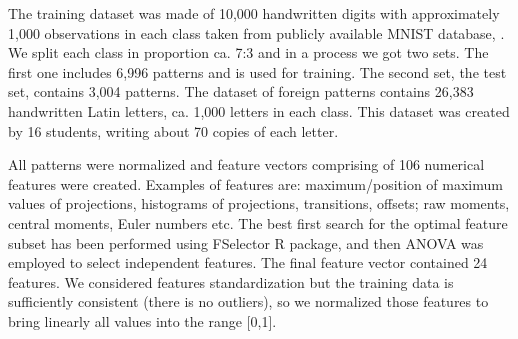 \documentclass{llncs}
\begin{document}
The training dataset was made of 10,000 handwritten digits with approximately 1,000 observations in each class taken from publicly available MNIST database, \cite{LeCunCortesBurges}. We split each class in proportion ca. 7:3 and in a process we got two sets. The first one includes 6,996 patterns and is used for training. The second set, the test set, contains 3,004 patterns. The dataset of foreign patterns contains 26,383 handwritten Latin letters, ca. 1,000 letters in each class. This dataset was created by 16 students, writing about 70 copies of each letter.

All patterns were normalized and feature vectors comprising of 106 numerical features were created. Examples of features are: maximum/position of maximum values of projections, histograms of projections, transitions, offsets; raw moments, central moments, Euler numbers etc.  The best first search for the optimal feature subset has been performed using FSelector R package, \cite{Romanski} and then ANOVA was employed to select independent features. The final feature vector contained 24 features. We considered features standardization but the training data is sufficiently consistent (there is no outliers), so we normalized those features to bring linearly all values into the range [0,1]. 

\end{document}
